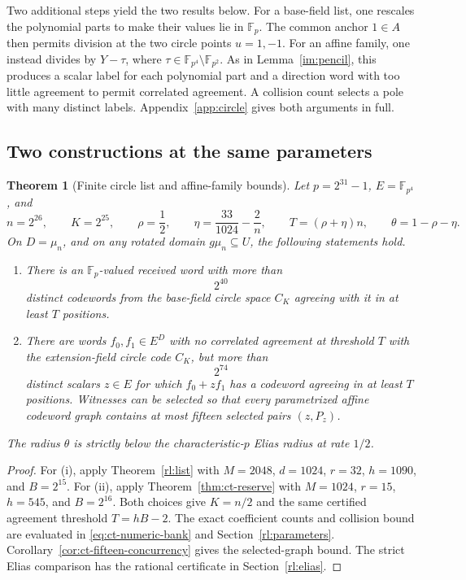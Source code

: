 \documentclass[11pt,letterpaper]{article}
\newtheorem{theorem}{Theorem}[section]
\theoremstyle{definition}
\theoremstyle{remark}
\newcommand{\F}{\mathbb F}
\begin{document}
Two additional steps yield the two results below. For a base-field list,
one rescales the polynomial parts to make their values lie in $\F_p$.
The common anchor $1\in A$ then permits division at the two circle
points $u=1,-1$. For an affine family, one instead divides by
$Y-\tau$, where $\tau\in\F_{p^4}\setminus\F_{p^2}$. As in
Lemma~\ref{im:pencil}, this produces a scalar label for each polynomial
part and a direction word with too little agreement to permit
correlated agreement. A collision count selects a pole with many
distinct labels. Appendix~\ref{app:circle} gives both arguments in full.

\subsection{Two constructions at the same parameters}

\begin{theorem}[Finite circle list and affine-family bounds]
\label{thm:circle-finite-summary}
Let $p=2^{31}-1$, $E=\F_{p^4}$, and
\[
 n=2^{26},\qquad K=2^{25},\qquad \rho=\frac12,\qquad
 \eta=\frac{33}{1024}-\frac2n,\qquad
 T=(\rho+\eta)n,\qquad \theta=1-\rho-\eta.
\]
On $D=\mu_n$, and on any rotated domain $g\mu_n\subseteq U$,
the following statements hold.
\begin{enumerate}[label=(\roman*)]
\item There is an $\F_p$-valued received word with more than
\[
 2^{40}
\]
distinct codewords from the base-field circle space $C_K$ agreeing
with it in at least $T$ positions.
\item There are words $f_0,f_1\in E^D$ with no correlated agreement
at threshold $T$ with the extension-field circle code $C_K$, but more than
\[
 2^{74}
\]
distinct scalars $z\in E$ for which $f_0+zf_1$ has a codeword agreeing
in at least $T$ positions. Witnesses can be selected so that every
parametrized affine codeword graph contains at most fifteen selected
pairs $(z,P_z)$.
\end{enumerate}
The radius $\theta$ is strictly below the characteristic-$p$ Elias
radius at rate $1/2$.
\end{theorem}
\begin{proof}
For (i), apply Theorem~\ref{rl:list} with
$M=2048$, $d=1024$, $r=32$, $h=1090$, and $B=2^{15}$.
For (ii), apply Theorem~\ref{thm:ct-reserve} with
$M=1024$, $r=15$, $h=545$, and $B=2^{16}$.
Both choices give $K=n/2$ and the same certified agreement threshold
$T=hB-2$.
The exact coefficient counts and collision bound are evaluated in
\eqref{eq:ct-numeric-bank} and Section~\ref{rl:parameters}.
Corollary~\ref{cor:ct-fifteen-concurrency} gives the selected-graph
bound. The strict Elias comparison has the rational certificate in
Section~\ref{rl:elias}.
\end{proof}
\end{document}
